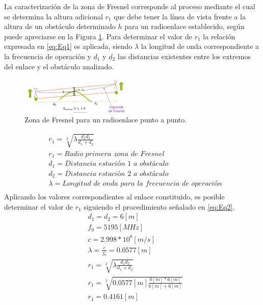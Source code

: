 \documentclass[conference]{IEEEtran}
\begin{document}
La caracterización de la zona de Fresnel corresponde al proceso mediante el cual se determina la altura adicional $r_1$ que debe tener la línea de vista
frente a la altura de un obstáculo determinado $h$ para un radioenlace establecido, según puede apreciarse en la Figura \ref{fig:Fresnel}. Para determinar el valor de $r_1$ la 
relación expresada en \ref{eq:Eq1} es aplicada, siendo $\lambda$ la longitud de onda correspondiente a la frecuencia de operación y $d_1$ y $d_2$ las distancias existentes
entre los extremos del enlace y el obstáculo analizado.
\begin{figure}
    \centering
          \includegraphics[width=0.47\textwidth]{Fresnel.png}
        \caption{Zona de Fresnel para un radioenlace punto a punto.
        }
        \label{fig:Fresnel}
\end{figure}
\begin{equation}
    \label{eq:Eq1}
    \begin{aligned}
        &r_{1} = \sqrt[2]{\lambda\frac{d_1d_2}{d_1+d_2}}\\
        &r_{1} = \textit{Radio primera zona de Fresnel}\\
        &d_{1} = \textit{Distancia estación 1 a obstáculo}\\
        &d_{2} = \textit{Distancia estación 2 a obstáculo}\\
        &\lambda = \textit{Longitud de onda para la frecuencia de operación}\\
    \end{aligned}
\end{equation}
Aplicando los valores correspondientes al enlace constituido, es posible determinar el valor de $r_1$ siguiendo el procedimiento
señalado en \ref{eq:Eq2}.
\begin{equation}
    \label{eq:Eq2}
    \begin{aligned}
        &d_1=d_2=6[m]\\
        &f_0 = 5195[MHz]\\
        &c = 2.998*10^{8}[m/s]\\
        &\lambda = \frac{c}{f_0}=0.0577[m]\\
        &r_{1} = \sqrt[2]{\lambda\frac{d_1d_2}{d_1+d_2}}\\
        &r_{1} = \sqrt[2]{0.0577[m]\frac{6[m]*6[m]}{6[m]+6[m]}}\\
        &r_{1} = 0.4161[m]\\
    \end{aligned}
\end{equation}
\end{document}
